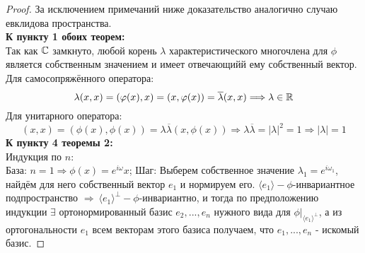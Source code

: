 \begin{proof}
    За исключением примечаний ниже доказательство аналогично случаю евклидова пространства.\\
    \textbf{К пункту 1 обоих теорем:}\\
    Так как $\mathbb{C}$ замкнуто, любой корень $\lambda$ характеристического многочлена для $\phi$ является собственным значением и имеет отвечающийй ему собственный вектор.\\
    Для самосопряжённого оператора:
    $$\lambda(x,x) = (\varphi(x), x) = (x, \varphi(x)) = \overline{\lambda}(x,x) \Longrightarrow \lambda \in \mathbb{R}$$
    Для унитарного оператора:
    $$(x,x) = (\phi(x), \phi(x)) = \lambda\overline{\lambda}(x, \phi(x)) \Longrightarrow \lambda\overline{\lambda} = |\lambda|^2 = 1 \Longrightarrow |\lambda| = 1$$
    \textbf{К пункту 4 теоремы 2:}\\
    Индукция по $n$:\\
    База: $n = 1 \Rightarrow \phi(x) = e^{i\omega}x$;
    Шаг: Выберем собственное значение $\lambda_1 = e^{i\omega_1}$, найдём для него собственный вектор $e_1$ и нормируем его. $\langle e_1 \rangle - \phi$-инвариантное подпространство $\Longrightarrow \ \langle e_1 \rangle^\perp - \phi$-инвариантно, и тогда по предположению индукции $\exists$ ортонормированный базис $e_2,...,e_n$ нужного вида для $\phi|_{\langle e_1 \rangle^\perp}$, а из ортогональности $e_1$ всем векторам этого базиса получаем, что $e_1,...,e_n$ - искомый базис.
\end{proof}